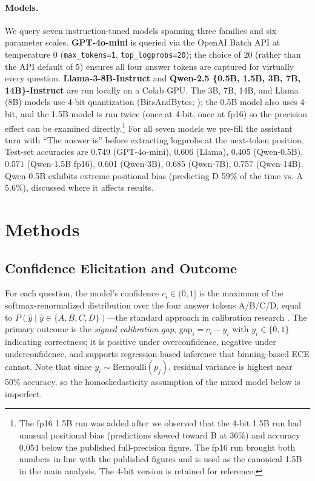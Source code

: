 \documentclass[11pt]{article}
\begin{document}
\paragraph{Models.}
We query seven instruction-tuned models spanning three families and six parameter
scales. \textbf{GPT-4o-mini} is queried via the OpenAI Batch API at temperature
0 (\texttt{max\_tokens=1}, \texttt{top\_logprobs=20}); the choice of 20 (rather
than the API default of 5) ensures all four answer tokens are captured for
virtually every question. \textbf{Llama-3-8B-Instruct} and \textbf{Qwen-2.5
\{0.5B, 1.5B, 3B, 7B, 14B\}-Instruct} are run locally on a Colab GPU. The 3B,
7B, 14B, and Llama (8B) models use 4-bit quantization (BitsAndBytes;
\citealt{dettmers2023qlora}); the 0.5B model also uses 4-bit, and the 1.5B
model is run twice (once at 4-bit, once at fp16) so the precision effect can be
examined directly.\footnote{The fp16 1.5B run was added after we observed that
the 4-bit 1.5B run had unusual positional bias (predictions skewed toward B at
36\%) and accuracy 0.054 below the published full-precision figure. The fp16
run brought both numbers in line with the published figures and is used as the
canonical 1.5B in the main analysis. The 4-bit version is retained for reference.} For all seven models we pre-fill the assistant turn
with ``The answer is'' before extracting logprobs at the next-token position.
Test-set accuracies are 0.749 (GPT-4o-mini), 0.606 (Llama), 0.405 (Qwen-0.5B),
0.571 (Qwen-1.5B fp16), 0.601 (Qwen-3B), 0.685 (Qwen-7B), 0.757 (Qwen-14B).
Qwen-0.5B exhibits extreme positional bias (predicting D 59\% of the time vs.
A 5.6\%), discussed where it affects results.

\section{Methods}

\subsection{Confidence Elicitation and Outcome}

For each question, the model's confidence $c_i \in (0,1]$ is the maximum of the
softmax-renormalized distribution over the four answer tokens A/B/C/D, equal to
$P(\hat{y} \mid \hat{y} \in \{A,B,C,D\})$---the standard approach in calibration
research \citep{kadavath2022language}. The primary outcome is the \emph{signed
calibration gap}, $\mathrm{gap}_i = c_i - y_i$ with $y_i \in \{0,1\}$ indicating
correctness; it is positive under overconfidence, negative under underconfidence,
and supports regression-based inference that binning-based ECE cannot. Note
that since $y_i \sim \mathrm{Bernoulli}(p_j)$, residual variance is highest near
50\% accuracy, so the homoskedasticity assumption of the mixed model below is
imperfect.
\end{document}
